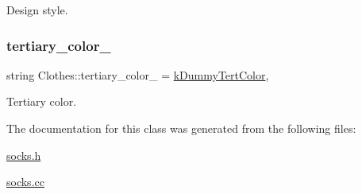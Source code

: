 Design style. 

\mbox{\label{classClothes_a3c5f1e7ab531e3ba7a38b930da8078a0}} 
\subsubsection{\texorpdfstring{tertiary\+\_\+color\+\_\+}{tertiary\_color\_}}
{\footnotesize\ttfamily string Clothes\+::tertiary\+\_\+color\+\_\+ = \mbox{\hyperlink{clothes_8h_a094dde85547895fd70dafb3ab10c6783}{k\+Dummy\+Tert\+Color}}\hspace{0.3cm}{\ttfamily [protected]}, {\ttfamily [inherited]}}



Tertiary color. 



The documentation for this class was generated from the following files\+:\begin{DoxyCompactItemize}
\item 
\mbox{\hyperlink{socks_8h}{socks.\+h}}\item 
\mbox{\hyperlink{socks_8cc}{socks.\+cc}}\end{DoxyCompactItemize}
